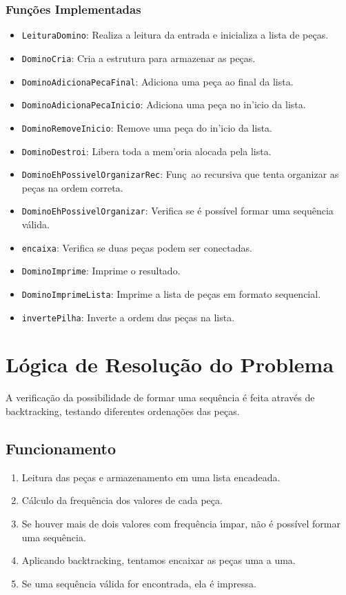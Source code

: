 \documentclass[a4paper,12pt]{article}
\begin{document}
\subsubsection{Fun\c{c}\~oes Implementadas}
\begin{itemize}
    \item \texttt{LeituraDomino}: Realiza a leitura da entrada e inicializa a lista de pe\c{c}as.
    \item \texttt{DominoCria}: Cria a estrutura para armazenar as pe\c{c}as.
    \item \texttt{DominoAdicionaPecaFinal}: Adiciona uma pe\c{c}a ao final da lista.
    \item\texttt{DominoAdicionaPecaInicio}: Adiciona uma pe\c{c}a no in'icio da lista.
    \item \texttt{DominoRemoveInicio}: Remove uma pe\c{c}a do in'icio da lista.
    \item \texttt{DominoDestroi}: Libera toda a mem'oria alocada pela lista.
    \item \texttt{DominoEhPossivelOrganizarRec}: Fun\c{c}~ao recursiva que tenta organizar as pe\c{c}as na ordem correta.
    \item \texttt{DominoEhPossivelOrganizar}: Verifica se \'e poss\'ivel formar uma sequ\^encia v\'alida.
    \item \texttt{encaixa}: Verifica se duas pe\c{c}as podem ser conectadas.
    \item \texttt{DominoImprime}: Imprime o resultado.
    \item \texttt{DominoImprimeLista}: Imprime a lista de pe\c{c}as em formato sequencial.
    \item \texttt{invertePilha}: Inverte a ordem das pe\c{c}as na lista.
\end{itemize}

\section{L\'ogica de Resolu\c{c}\~ao do Problema}
A verifica\c{c}\~ao da possibilidade de formar uma sequ\^encia \'e feita atrav\'es de backtracking, testando diferentes ordena\c{c}\~oes das pe\c{c}as.

\subsection{Funcionamento}
\begin{enumerate}
    \item Leitura das pe\c{c}as e armazenamento em uma lista encadeada.
    \item C\'alculo da frequ\^encia dos valores de cada pe\c{c}a.
    \item Se houver mais de dois valores com frequ\^encia \'{\i}mpar, n\~ao \'e poss\'ivel formar uma sequ\^encia.
    \item Aplicando backtracking, tentamos encaixar as pe\c{c}as uma a uma.
    \item Se uma sequ\^encia v\'alida for encontrada, ela \'e impressa.
\end{enumerate}
\end{document}
